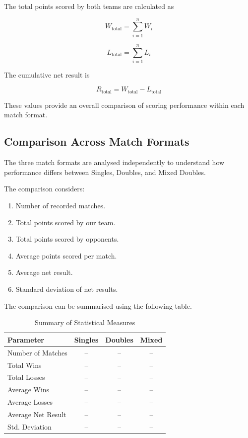 The total points scored by both teams are calculated
as

\[
W_{\text{total}} =
\sum_{i=1}^{n} W_i
\]

\[
L_{\text{total}} =
\sum_{i=1}^{n} L_i
\]

The cumulative net result is

\[
R_{\text{total}} =
W_{\text{total}} - L_{\text{total}}
\]

These values provide an overall comparison of
scoring performance within each match format.

\subsection{Comparison Across Match Formats}

The three match formats are analysed independently
to understand how performance differs between
Singles, Doubles, and Mixed Doubles.

The comparison considers:

\begin{enumerate}
    \item Number of recorded matches.
    \item Total points scored by our team.
    \item Total points scored by opponents.
    \item Average points scored per match.
    \item Average net result.
    \item Standard deviation of net results.
\end{enumerate}

The comparison can be summarised using the following
table.

\begin{table}[H]
\centering
\caption{Summary of Statistical Measures}
\begin{tabular}{lccc}
\toprule
\textbf{Parameter} &
\textbf{Singles} &
\textbf{Doubles} &
\textbf{Mixed} \\
\midrule
Number of Matches & -- & -- & -- \\
Total Wins        & -- & -- & -- \\
Total Losses      & -- & -- & -- \\
Average Wins      & -- & -- & -- \\
Average Losses    & -- & -- & -- \\
Average Net Result& -- & -- & -- \\
Std. Deviation    & -- & -- & -- \\
\bottomrule
\end{tabular}
\end{table}

